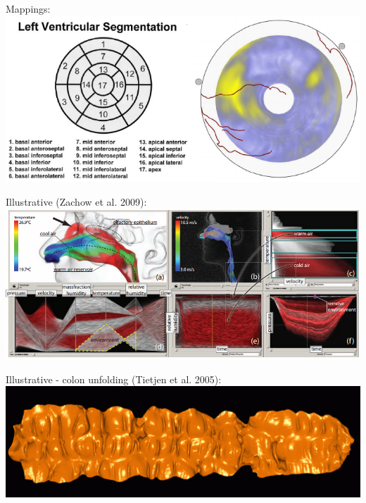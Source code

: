 \documentclass{beamer}
\begin{document}
\begin{frame}
	Mappings:
	\includegraphics[width=\textwidth]{images/heart}
\end{frame}

\begin{frame}
	Illustrative (Zachow et al. 2009):
	\includegraphics[width=\textwidth]{images/nose}
\end{frame}

\begin{frame}
	Illustrative - colon unfolding (Tietjen et al. 2005):
	\includegraphics[width=\textwidth]{images/colon}
\end{frame}
\end{document}
